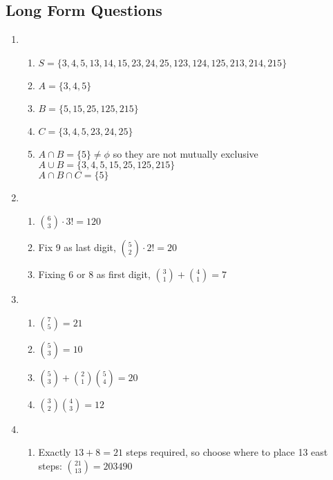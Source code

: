 \documentclass[12pt, a4paper]{article}
\begin{document}
\subsection*{Long Form Questions}
\begin{enumerate}[Q\arabic*.]
  \item 
    \begin{enumerate}[(\roman*)]
      \item $S = \{3, 4, 5, 13, 14, 15, 23, 24, 25, 123, 124, 125, 213, 214, 215\}$
      
      \item $A = \{3, 4, 5\}$

      \item $B = \{5, 15, 25, 125, 215\}$

      \item $C = \{3, 4, 5, 23, 24, 25\}$

      \item $A \cap B = \{5\} \neq \phi$ so they are not mutually exclusive
        $A \cup B = \{3, 4, 5, 15, 25, 125, 215\}$\\
        $A \cap B \cap C = \{5\}$
    \end{enumerate}

  \item 
    \begin{enumerate}[(\roman*)]
      \item $\displaystyle\binom 63 \cdot 3! = 120$

      \item Fix 9 as last digit, $\displaystyle\binom 52 \cdot 2! = 20$

      \item Fixing 6 or 8 as first digit, $\displaystyle\binom 31 + \binom 41 = 7$
    \end{enumerate}

  \item 
    \begin{enumerate}[(\roman*)]
      \item $\displaystyle\binom 75 = 21$

      \item $\displaystyle\binom 53 = 10$

      \item $\displaystyle\binom 53 + \binom 21 \binom 54 = 20$

      \item $\displaystyle\binom 32 \binom 43 = 12$
    \end{enumerate}

  \item 
    \begin{enumerate}[(\roman*)]
      \item Exactly $13 + 8 = 21$ steps required, so choose where to place 13 east steps: $\displaystyle\binom {21}{13} = 203490$


\end{enumerate}
\end{enumerate}
\end{document}
